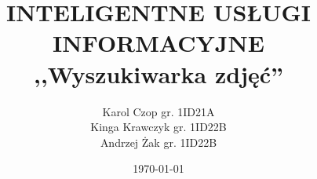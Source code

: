 \documentclass[12pt]{article}
\begin{document}
\title{INTELIGENTNE USŁUGI INFORMACYJNE\\,,Wyszukiwarka zdjęć''}
\author{Karol Czop gr. 1ID21A \\
        Kinga Krawczyk gr. 1ID22B \\
        Andrzej Żak gr. 1ID22B \\}
\date{\today}

\maketitle










\end{document}
